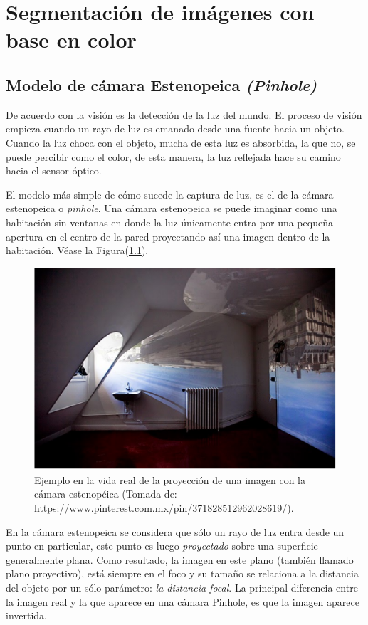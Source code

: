 \chapter{Segmentación de imágenes con base en color}
	\section{Modelo de cámara Estenopeica \textit{(Pinhole)}}

De acuerdo con \cite{bradski2008learning} la visión es la detección de la luz del mundo. El proceso de visión empieza cuando un rayo de luz es emanado desde una fuente hacia un objeto. Cuando la luz choca con el objeto, mucha de esta luz es absorbida, la que no, se puede percibir como el color, de esta manera, la luz reflejada hace su camino hacia el sensor óptico.

El modelo más simple de cómo sucede la captura de luz, es el de la cámara estenopeica o \textit{pinhole}. Una cámara estenopeica se puede imaginar como una habitación sin ventanas en donde la luz únicamente entra por una pequeña apertura en el centro de la pared proyectando así una imagen dentro de la habitación. Véase la Figura(\ref{fig:pinholeCamera}).

\begin{figure}
	\centering		
	\includegraphics[scale=0.7]{images/pinholeCamera.pdf}
	\caption{Ejemplo en la vida real de la proyección de una imagen con la cámara estenopéica (Tomada de: https://www.pinterest.com.mx/pin/371828512962028619/).}		
	\label{fig:pinholeCamera}
\end{figure}

En la cámara estenopeica se considera que sólo un rayo de luz entra desde un punto en particular, este punto es luego \textit{proyectado} sobre una superficie generalmente plana. Como resultado, la imagen en este plano (también llamado plano proyectivo), está siempre en el foco y su tamaño se relaciona a la distancia del objeto por un sólo parámetro: \textit{la distancia focal}. La principal diferencia entre la imagen real y la que aparece en una cámara Pinhole, es que la imagen aparece invertida. 
	
